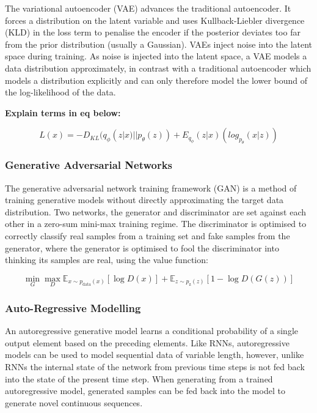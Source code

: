 The variational autoencoder (VAE) \citep{kingma2013auto, rezende2014stochastic} advances the traditional autoencoder.
It forces a distribution on the latent variable and uses Kullback-Liebler divergence (KLD) in the loss term to penalise the encoder if the posterior deviates too far from the prior distribution (usually a Gaussian). 
VAEs inject noise into the latent space during training.
As noise is injected into the latent space, a VAE models a data distribution approximately, in contrast with a traditional autoencoder which models a distribution explicitly and can only therefore model the lower bound of the log-likelihood of the data. 

\textbf{Explain terms in eq below:}

\begin{equation}
\label{eq:vae}
L(x) = -D_{KL}(q_{\phi}(z|x)||p_{\theta}(z)) + E_{q_\phi}(z|x)(log_{p_{\theta}}(x|z))
\end{equation}

\subsubsection{Generative Adversarial Networks}

The generative adversarial network training framework (GAN) \citep{goodfellow2014generative} is a method of training generative models without directly approximating the target data distribution. 
Two networks, the generator and discriminator are set against each other in a zero-sum mini-max training regime. 
The discriminator is optimised to correctly classify real samples from a training set and fake samples from the generator, where the generator is optimised to fool the discriminator into thinking its samples are real, using the value function: 

\begin{equation}
\label{eq:gan}
\min_{G}\max_{D}\mathbb{E}_{x\sim p_{\text{data}}(x)}[\log{D(x)}] + \mathbb{E}_{z\sim p_{\text{z}}(z)}[1 - \log{D(G(z))}]
\end{equation}

\subsubsection{Auto-Regressive Modelling}
\label{c2:subsubsec:autoregressive}

An autoregressive generative model learns a conditional probability of a single output element based on the preceding elements. 
Like RNNs, autoregressive models can be used to model sequential data of variable length, however, unlike RNNs the internal state of the network from previous time steps is not fed back into the state of the present time step. 
When generating from a trained autoregressive model, generated samples can be fed back into the model to generate novel continuous sequences.

